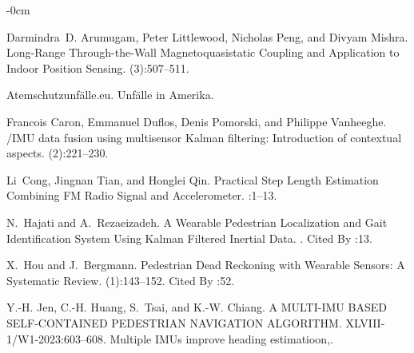\documentclass[engproc,conferenceproceedings,submit,pdftex,moreauthors]{Definitions/mdpi}
\begin{document}
\begin{adjustwidth}{-\extralength}{0cm}



%

\begin{thebibliography}{999}
Darmindra~D. Arumugam, Peter Littlewood, Nicholas Peng, and Divyam Mishra.
\newblock Long-{{Range Through-the-Wall Magnetoquasistatic Coupling}} and
{{Application}} to {{Indoor Position Sensing}}.
(3):507--511.

Atemschutzunfälle.eu.
\newblock Unfälle in {{Amerika}}.

Francois Caron, Emmanuel Duflos, Denis Pomorski, and Philippe Vanheeghe.
/{{IMU}} data fusion using multisensor {{Kalman}} filtering:
Introduction of contextual aspects.
(2):221--230.

Li~Cong, Jingnan Tian, and Honglei Qin.
\newblock Practical {{Step Length Estimation Combining FM Radio Signal}} and
{{Accelerometer}}.
:1--13.

N.~Hajati and A.~Rezaeizadeh.
\newblock A {{Wearable Pedestrian Localization}} and {{Gait Identification
		System Using Kalman Filtered Inertial Data}}.
.
\newblock Cited By :13.

X.~Hou and J.~Bergmann.
\newblock Pedestrian {{Dead Reckoning}} with {{Wearable Sensors}}: {{A
		Systematic Review}}.
(1):143--152.
\newblock Cited By :52.

Y.-H. Jen, C.-H. Huang, S.~Tsai, and K.-W. Chiang.
\newblock A {{MULTI-IMU BASED SELF-CONTAINED PEDESTRIAN NAVIGATION ALGORITHM}}.
\newblock XLVIII-1/W1-2023:603--608.
\newblock Multiple IMUs improve heading estimatioon,.


\end{thebibliography}
\end{adjustwidth}
\end{document}
